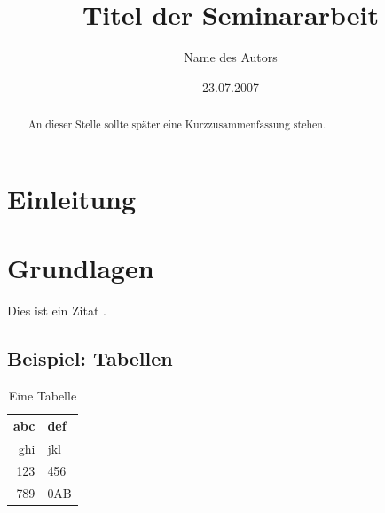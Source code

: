 \documentclass[runningheads]{llncs}
\begin{document}
\mainmatter
\title{Titel der Seminararbeit}
\author{Name des Autors}
\date{23.07.2007}
\maketitle


\begin{abstract}
  An dieser Stelle sollte später eine Kurzzusammenfassung stehen.
\end{abstract}


\section{Einleitung}
\label{sec:Einleitung}

\lipsum


\section{Grundlagen}
\label{sec:Grundlagen}

\lipsum[1-2]

Dies ist ein Zitat \cite{becker2008a}.

\subsection{Beispiel: Tabellen}
\label{subsec:Tables}

\lipsum[3]

\begin{table}[h]
  \centering
  \caption{Eine Tabelle}
  \label{tab:atable}
  \begin{tabular}{|r|l|} \hline
    abc & def\\ \hline
    ghi & jkl\\ \hline
    123 & 456\\ \hline
    789 & 0AB\\ \hline
  \end{tabular}
\end{table}
\end{document}
